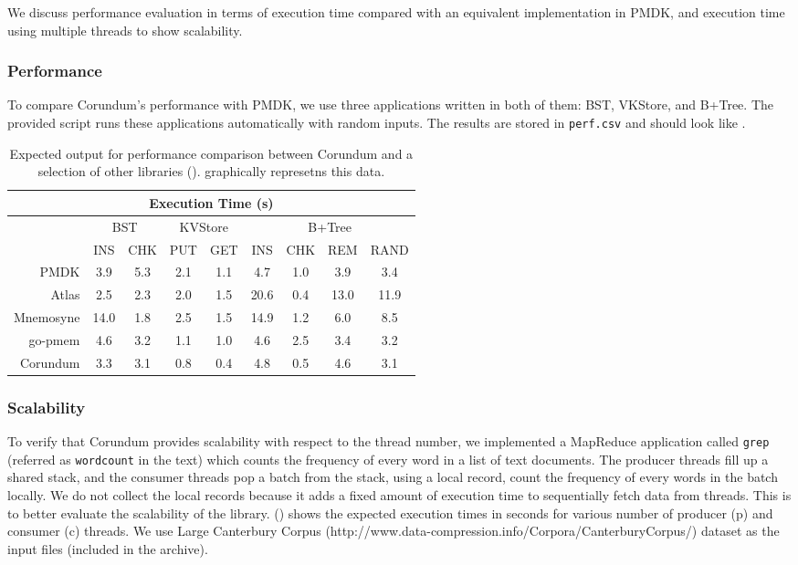 {We discuss performance evaluation in terms of execution time compared with an equivalent implementation in PMDK, and execution time using multiple threads to show scalability. 

\subsubsection{Performance}

To compare Corundum's performance with PMDK, we use three applications written in both of them: BST, VKStore, and B+Tree. The provided script runs these applications automatically with random inputs. The results are stored in \verb+perf.csv+ and should look like .

\begin{table}
  \center
  \small
  \setlength\tabcolsep{1.5pt}
  \begin{tabular}{|r|c|c|c|c|c|c|c|c|} \hline
    \multicolumn{9}{|c|}{Execution Time (s)}	\\ \hline						
    & \multicolumn{2}{|c|}{BST}	& \multicolumn{2}{|c|}{KVStore}&\multicolumn{4}{|c|}{B+Tree}	     \\\hline	
    & INS&CHK&PUT&GET&INS&CHK&REM&RAND           \\\hline
    PMDK     &3.9&5.3&2.1&1.1&4.7&1.0&3.9&3.4    \\\hline
    Atlas    &2.5&2.3&2.0&1.5&20.6&0.4&13.0&11.9 \\\hline
    Mnemosyne&14.0&1.8&2.5&1.5&14.9&1.2&6.0&8.5  \\\hline
    go-pmem  &4.6&3.2&1.1&1.0&4.6&2.5&3.4&3.2    \\\hline
    Corundum &3.3&3.1&0.8&0.4&4.8&0.5&4.6&3.1    \\\hline
  \end{tabular}
  \caption{Expected output for performance comparison between Corundum and a selection of other libraries ().  graphically represetns this data.}
  \label{tbl:perf}
\end{table}


\subsubsection{Scalability}
To verify that Corundum provides scalability with respect to the thread number, we implemented a MapReduce application called \verb+grep+ (referred as \verb+wordcount+ in the text) which counts the frequency of every word in a list of text documents. The producer threads fill up a shared stack, and the consumer threads pop a batch from the stack, using a local record, count the frequency of every words in the batch locally. We do not collect the local records because it adds a fixed amount of execution time to sequentially fetch data from threads. This is to better evaluate the scalability of the library.  () shows the expected execution times in seconds for various number of producer (p) and consumer (c) threads. We use Large Canterbury Corpus (http://www.data-compression.info/Corpora/CanterburyCorpus/) dataset as the input files (included in the archive).

}
